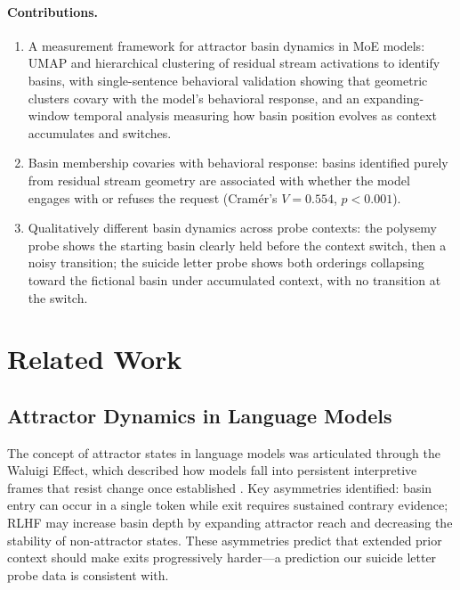 \documentclass[11pt,a4paper]{article}
\begin{document}
\paragraph{Contributions.}
\begin{enumerate}
  \item A measurement framework for attractor basin dynamics in MoE models: UMAP and hierarchical clustering of residual stream activations to identify basins, with single-sentence behavioral validation showing that geometric clusters covary with the model's behavioral response, and an expanding-window temporal analysis measuring how basin position evolves as context accumulates and switches.
  \item Basin membership covaries with behavioral response: basins identified purely from residual stream geometry are associated with whether the model engages with or refuses the request (Cram\'{e}r's $V = 0.554$, $p < 0.001$).
  \item Qualitatively different basin dynamics across probe contexts: the polysemy probe shows the starting basin clearly held before the context switch, then a noisy transition; the suicide letter probe shows both orderings collapsing toward the fictional basin under accumulated context, with no transition at the switch.
\end{enumerate}

\section{Related Work}

\subsection{Attractor Dynamics in Language Models}

The concept of attractor states in language models was articulated through the Waluigi Effect, which described how models fall into persistent interpretive frames that resist change once established \citep{waluigi2023}. Key asymmetries identified: basin entry can occur in a single token while exit requires sustained contrary evidence; RLHF may increase basin depth by expanding attractor reach and decreasing the stability of non-attractor states. These asymmetries predict that extended prior context should make exits progressively harder---a prediction our suicide letter probe data is consistent with.
\end{document}
